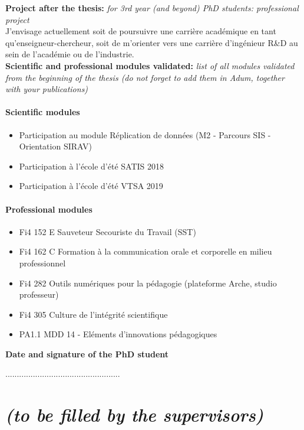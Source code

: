 \documentclass[12pt]{article}
\newcommand{\commentaire}[1]{\small\textit{#1}}
\begin{document}
\noindent\textbf{Project after the thesis:}
\commentaire{%
  for 3rd year (and beyond) PhD students: professional project\\}
J'envisage actuellement soit de poursuivre une carrière académique en tant qu'enseigneur-chercheur, soit de m'orienter vers une carrière d'ingénieur R\&D au sein de l'académie ou de l'industrie.
\\

\noindent\textbf{Scientific and professional modules validated:}
\commentaire{%
  list of all modules validated from the beginning of the thesis (do
  not forget to add them in Adum, together with your publications)}
\paragraph{\footnotesize Scientific modules}
  \begin{itemize}
      \itemsep0em
      \item Participation au module Réplication de données (M2 - Parcours SIS - Orientation SIRAV)
      \item Participation à l'école d'été SATIS 2018
      \item Participation à l'école d'été VTSA 2019
  \end{itemize}
\paragraph{\footnotesize Professional modules}
  \begin{itemize}
      \itemsep0em
      \item Fi4 152 E Sauveteur Secouriste du Travail (SST)
      \item Fi4 162 C Formation à la communication orale et corporelle en milieu professionnel
      \item Fi4 282 Outils numériques pour la pédagogie (plateforme Arche, studio professeur)
      \item Fi4 305 Culture de l’intégrité scientifique
      \item PA1.1 MDD 14 - Eléments d’innovations pédagogiques
  \end{itemize}

\noindent\textbf{Date and signature of the PhD student}

..................................................


\newpage
\section*{ \textit{\small (to be filled by the supervisors)}}
\end{document}

